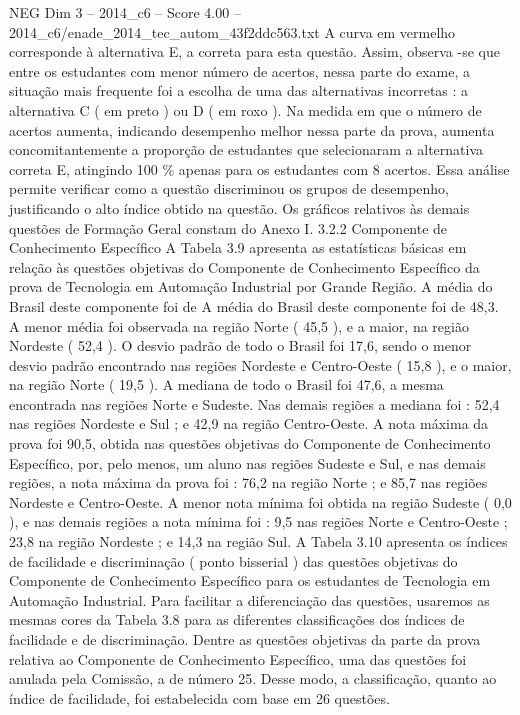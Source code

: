 \begin{textsample}{NEG Dim 3 – 2014\_c6 – Score 4.00 – 2014\_c6/enade\_2014\_tec\_autom\_43f2ddc563.txt}
A curva em vermelho corresponde à alternativa E, a correta para esta questão.
Assim, observa -se que entre os estudantes com menor número de acertos, nessa parte do exame, a situação mais frequente foi a escolha de uma das alternativas incorretas : a alternativa C ( em preto ) ou D ( em roxo ).
Na medida em que o número de acertos aumenta, indicando desempenho melhor nessa parte da prova, aumenta concomitantemente a proporção de estudantes que selecionaram a alternativa correta E, atingindo 100 \% apenas para os estudantes com 8 acertos.
Essa análise permite verificar como a questão discriminou os grupos de desempenho, justificando o alto índice obtido na questão.
Os gráficos relativos às demais questões de Formação Geral constam do Anexo I. 3.2.2 Componente de Conhecimento Específico A Tabela 3.9 apresenta as estatísticas básicas em relação às questões objetivas do Componente de Conhecimento Específico da prova de Tecnologia em Automação Industrial por Grande Região.
A média do Brasil deste componente foi de A média do Brasil deste componente foi de 48,3.
A menor média foi observada na região Norte ( 45,5 ), e a maior, na região Nordeste ( 52,4 ).
O desvio padrão de todo o Brasil foi 17,6, sendo o menor desvio padrão encontrado nas regiões Nordeste e Centro-Oeste ( 15,8 ), e o maior, na região Norte ( 19,5 ).
A mediana de todo o Brasil foi 47,6, a mesma encontrada nas regiões Norte e Sudeste.
Nas demais regiões a mediana foi : 52,4 nas regiões Nordeste e Sul ; e 42,9 na região Centro-Oeste.
A nota máxima da prova foi 90,5, obtida nas questões objetivas do Componente de Conhecimento Específico, por, pelo menos, um aluno nas regiões Sudeste e Sul, e nas demais regiões, a nota máxima da prova foi : 76,2 na região Norte ; e 85,7 nas regiões Nordeste e Centro-Oeste.
A menor nota mínima foi obtida na região Sudeste ( 0,0 ), e nas demais regiões a nota mínima foi : 9,5 nas regiões Norte e Centro-Oeste ; 23,8 na região Nordeste ; e 14,3 na região Sul.
A Tabela 3.10 apresenta os índices de facilidade e discriminação ( ponto bisserial ) das questões objetivas do Componente de Conhecimento Específico para os estudantes de Tecnologia em Automação Industrial.
Para facilitar a diferenciação das questões, usaremos as mesmas cores da Tabela 3.8 para as diferentes classificações dos índices de facilidade e de discriminação.
Dentre as questões objetivas da parte da prova relativa ao Componente de Conhecimento Específico, uma das questões foi anulada pela Comissão, a de número 25.
Desse modo, a classificação, quanto ao índice de facilidade, foi estabelecida com base em 26 questões.

\end{textsample}
